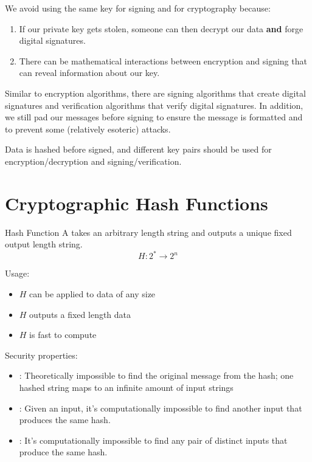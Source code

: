 \documentclass[12pt]{report}
\begin{document}
We avoid using the same key for signing and for cryptography because:
\begin{enumerate}[noitemsep]
    \item If our private key gets stolen, someone can then decrypt our data \textbf{and} forge digital signatures.
    \item There can be mathematical interactions between encryption and signing that can reveal information about our key.
\end{enumerate}


Similar to encryption algorithms, there are signing algorithms that create digital signatures and verification algorithms that verify digital signatures. In addition, we still pad our messages before signing to ensure the message is formatted and to prevent some (relatively esoteric) attacks.

Data is hashed before signed, and different key pairs should be used for encryption/decryption and signing/verification.

\section{Cryptographic Hash Functions}

\begin{dfnbox}{Hash Function}{}
    A  takes an arbitrary length string and outputs a unique fixed output length string.
    \tcblower
    \[ H : 2^* \to 2^n \]
\end{dfnbox}

Usage:
\begin{itemize}[noitemsep]
    \item $H$ can be applied to data of any size
    \item $H$ outputs a fixed length data
    \item $H$ is fast to compute
\end{itemize}

Security properties:
\begin{itemize}[noitemsep]
    \item {}: Theoretically impossible to find the original message from the hash; one hashed string maps to an infinite amount of input strings
    \item {}: Given an input, it's computationally impossible to find another input that produces the same hash.
    \item {}: It's computationally impossible to find any pair of distinct inputs that produce the same hash.
\end{itemize}
\end{document}
